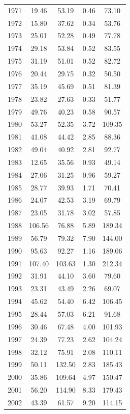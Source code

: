 \documentclass[12pt,]{article}
\begin{document}
\begin{longtable}{ccccc}
  1971 & 19.46 & 53.19 & 0.46 & 73.10 \\ 
  1972 & 15.80 & 37.62 & 0.34 & 53.76 \\ 
  1973 & 25.01 & 52.28 & 0.49 & 77.78 \\ 
  1974 & 29.18 & 53.84 & 0.52 & 83.55 \\ 
  1975 & 31.19 & 51.01 & 0.52 & 82.72 \\ 
  1976 & 20.44 & 29.75 & 0.32 & 50.50 \\ 
  1977 & 35.19 & 45.69 & 0.51 & 81.39 \\ 
  1978 & 23.82 & 27.63 & 0.33 & 51.77 \\ 
  1979 & 49.76 & 40.23 & 0.58 & 90.57 \\ 
  1980 & 53.27 & 52.35 & 3.72 & 109.35 \\ 
  1981 & 41.08 & 44.42 & 2.85 & 88.36 \\ 
  1982 & 49.04 & 40.92 & 2.81 & 92.77 \\ 
  1983 & 12.65 & 35.56 & 0.93 & 49.14 \\ 
  1984 & 27.06 & 31.25 & 0.96 & 59.27 \\ 
  1985 & 28.77 & 39.93 & 1.71 & 70.41 \\ 
  1986 & 24.07 & 42.53 & 3.19 & 69.79 \\ 
  1987 & 23.05 & 31.78 & 3.02 & 57.85 \\ 
  1988 & 106.56 & 76.88 & 5.89 & 189.34 \\ 
  1989 & 56.79 & 79.32 & 7.90 & 144.00 \\ 
  1990 & 95.63 & 92.27 & 1.16 & 189.06 \\ 
  1991 & 107.40 & 103.63 & 1.30 & 212.34 \\ 
  1992 & 31.91 & 44.10 & 3.60 & 79.60 \\ 
  1993 & 23.31 & 43.49 & 2.26 & 69.07 \\ 
  1994 & 45.62 & 54.40 & 6.42 & 106.45 \\ 
  1995 & 28.44 & 57.03 & 6.21 & 91.68 \\ 
  1996 & 30.46 & 67.48 & 4.00 & 101.93 \\ 
  1997 & 24.39 & 77.23 & 2.62 & 104.24 \\ 
  1998 & 32.12 & 75.91 & 2.08 & 110.11 \\ 
  1999 & 50.11 & 132.50 & 2.83 & 185.43 \\ 
  2000 & 35.86 & 109.64 & 4.97 & 150.47 \\ 
  2001 & 56.20 & 114.90 & 8.33 & 179.43 \\ 
  2002 & 43.39 & 61.57 & 9.20 & 114.15 \\ 

\end{longtable}
\end{document}
